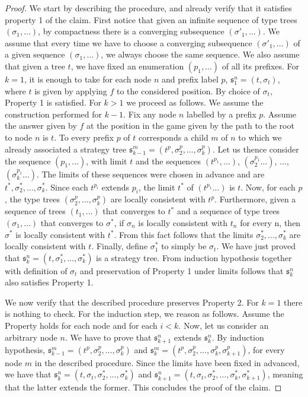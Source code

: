 \begin{proof}
We start by describing the procedure, and already verify that it satisfies property 1 of the claim. First notice that given an infinite sequence of type trees $(\sigma_1, \dots)$, by compactness there is a converging subsequence $(\sigma'_1, \dots)$. We assume that every time we have to choose  
a converging subsequence $(\sigma'_1, \dots)$ of a given sequence $(\sigma_1, \dots)$, we always choose the same sequence. We also assume that given a tree $t$, we have fixed an enumeration $(p_1, \dots)$ of all its prefixes.
For $k=1$, 
it is enough to take for each node $n$ and prefix label $p$, $\mathfrak{s}^n_1=(t, \sigma_t)$, where $t$ is given by applying $f$ to the considered position. By choice of $\sigma_t$, Property 1 is satisfied.
For $k>1$ we proceed as follows. We assume the construction performed for $k-1$. Fix any node $n$ labelled by a prefix $p$. Assume the answer given by $f$  at the position in the game given by the path to the root to node $n$ is $t$. To every prefix $p$ of $t$ corresponds a child $m$ of $n$ to which we already associated a strategy tree $\mathfrak{s}^m_{k-1}=(t^p, \sigma^p_{2}, \dots, \sigma^p_{k})$. 
Let us thence consider the sequence $(p_1, \dots)$, with limit $t$ and the sequences
$(t^{p_1}, \dots)$, $(\sigma^{p_1}_2\dots)$, $\dots,$  $(\sigma^{p_1}_{k}\dots)$.  The limits of these sequences were chosen in advance and are $t^*, \sigma^*_2, \dots, \sigma^*_k$. Since each $t^{p_i}$ extends $p_i$, the limit $t^*$ of  $(t^{p_1}\dots)$ is $t$.
Now, for each $p$, the type trees $(\sigma^p_{2}, \dots, \sigma^p_{k})$
are locally consistent with $t^p$. Furthermore, given a sequence of trees $(t_1, \dots)$  that converges to $t^*$ and a sequence of type trees $(\sigma_1, \dots)$  that converges to $\sigma^*$, if $\sigma_n$ is locally consistent with $t_n$ for every n, then $\sigma^*$ is locally consistent with $t^*$.
From this fact follows that the limits $\sigma^*_2, \dots, \sigma^*_k$ are locally consistent with $t$. Finally, define $\sigma^*_1$ to simply be $\sigma_t$. We have just proved that
$\mathfrak{s}^n_k = (t, \sigma^*_1, \dots, \sigma^*_k)$
is a strategy tree. From induction hypothesis together with definition of $\sigma_t$ and preservation of Property 1 under limits follows that $\mathfrak{s}^n_k$ also 
satisfies Property 1. 

We now verify that the described procedure preserves Property 2. For $k=1$ there is nothing to check. For the induction step, we reason as follows. Assume the Property holds for each node and for each $i<k$. Now, let us consider an arbitrary node $n$. We have to prove that $\mathfrak{s}^n_{k+1}$ extends $\mathfrak{s}^n_{k}$. 
By induction hypothesis,  $\mathfrak{s}^m_{k-1}=(t^p, \sigma^p_{2}, \dots, \sigma^p_{k})$ and
$\mathfrak{s}^m_{k}=(t^p, \sigma^p_{2}, \dots, \sigma^p_{k}, \sigma^p_{k+1})$, for every node $m$  in the described procedure. Since the limits have been fixed in advanced, we have that $\mathfrak{s}^n_{k}=(t, \sigma_t, \sigma^*_2, \dots, \sigma^*_k)$ and $\mathfrak{s}^n_{k+1}=(t, \sigma_t, \sigma^*_2, \dots, \sigma^*_k, \sigma^*_{k+1})$, meaning that the latter extends the former. This concludes the proof of the claim.
 \end{proof}
 
